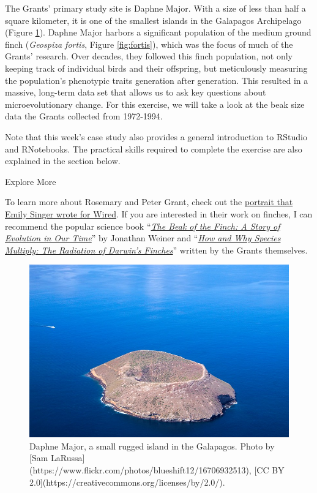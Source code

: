 \documentclass[
]{book}
\begin{document}
The Grants' primary study site is Daphne Major. With a size of less than half a square kilometer, it is one of the smallest islands in the Galapagos Archipelago (Figure \ref{fig:daphne}). Daphne Major harbors a significant population of the medium ground finch (\emph{Geospiza fortis}, Figure \ref{fig:fortis}), which was the focus of much of the Grants' research. Over decades, they followed this finch population, not only keeping track of individual birds and their offspring, but meticulously measuring the population's phenotypic traits generation after generation. This resulted in a massive, long-term data set that allows us to ask key questions about microevolutionary change. For this exercise, we will take a look at the beak size data the Grants collected from 1972-1994.

Note that this week's case study also provides a general introduction to RStudio and RNotebooks. The practical skills required to complete the exercise are also explained in the section below.

Explore More

To learn more about Rosemary and Peter Grant, check out the \href{https://www.wired.com/2016/10/legendary-biologists-clocked-evolutions-astonishing-speed/}{portrait that Emily Singer wrote for Wired}. If you are interested in their work on finches, I can recommend the popular science book ``\href{https://www.amazon.com/Beak-Finch-Story-Evolution-Time/dp/067973337X}{\emph{The Beak of the Finch: A Story of Evolution in Our Time}}'' by Jonathan Weiner and ``\href{https://www.amazon.com/How-Why-Species-Multiply-Evolutionary/dp/0691149992}{\emph{How and Why Species Multiply: The Radiation of Darwin's Finches}}'' written by the Grants themselves.

\begin{figure}
\includegraphics[width=1\linewidth]{images/daphne_major} \caption{Daphne Major, a small rugged island in the Galapagos. Photo by [Sam LaRussa](https://www.flickr.com/photos/blueshift12/16706932513), [CC BY 2.0](https://creativecommons.org/licenses/by/2.0/).}\label{fig:daphne}
\end{figure}
\end{document}
